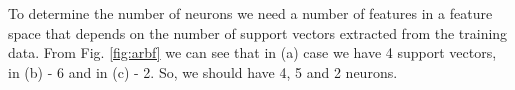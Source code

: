 \documentclass[a4paper, 12pt]{article}
\begin{document}
To determine the number of neurons we need a number of features in a feature space that depends on the number of support vectors extracted from the training data. From Fig. \ref{fig:arbf} we can see that in (a) case we have 4 support vectors, in (b) - 6 and in (c) - 2. So, we should have 4, 5 and 2 neurons.
\end{document}
